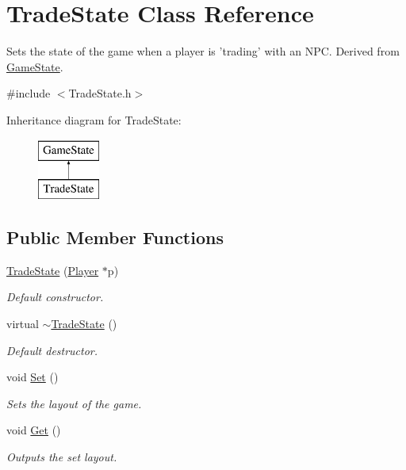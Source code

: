 \hypertarget{classTradeState}{\section{Trade\-State Class Reference}
\label{classTradeState}
}


Sets the state of the game when a player is 'trading' with an N\-P\-C. Derived from \hyperlink{classGameState}{Game\-State}.  




{\ttfamily \#include $<$Trade\-State.\-h$>$}

Inheritance diagram for Trade\-State\-:\begin{figure}[H]
\begin{center}
\leavevmode
\includegraphics[height=2.000000cm]{classTradeState}
\end{center}
\end{figure}
\subsection*{Public Member Functions}
\begin{DoxyCompactItemize}
\item 
\hyperlink{classTradeState_af89b3e3872cd71acbd27d36b05c913e8}{Trade\-State} (\hyperlink{classPlayer}{Player} $\ast$p)
\begin{DoxyCompactList}\small\item\em Default constructor. \end{DoxyCompactList}\item 
virtual \hyperlink{classTradeState_a1853dfb4248407b96035822d043570ad}{$\sim$\-Trade\-State} ()
\begin{DoxyCompactList}\small\item\em Default destructor. \end{DoxyCompactList}\item 
void \hyperlink{classTradeState_af0d9fdcd649c1e74620dc77a4b8f92f9}{Set} ()
\begin{DoxyCompactList}\small\item\em Sets the layout of the game. \end{DoxyCompactList}\item 
void \hyperlink{classTradeState_a6479e704b1063281721200a0beac6bc1}{Get} ()
\begin{DoxyCompactList}\small\item\em Outputs the set layout. \end{DoxyCompactList}\end{DoxyCompactItemize}

